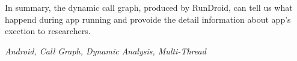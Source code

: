 In summary, the dynamic call graph, produced by RunDroid, can tell us what happend during app running and provoide the detail information about app's exection to researchers.


{} \textit{Android, Call Graph, Dynamic Analysis, Multi-Thread}


































